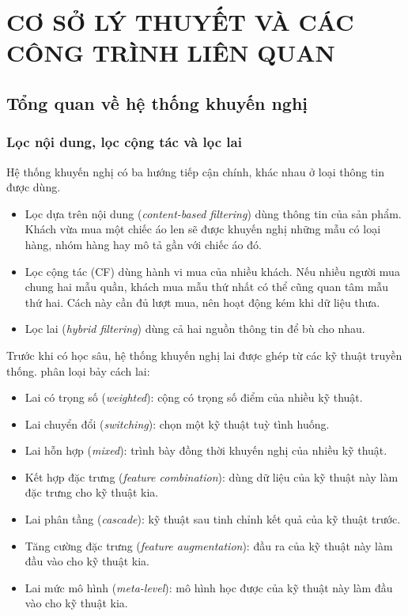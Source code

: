 \chapter{CƠ SỞ LÝ THUYẾT VÀ CÁC CÔNG TRÌNH LIÊN QUAN}
\label{chap:lythuyet}

\section{Tổng quan về hệ thống khuyến nghị}
\label{sec:tongquan_rs}

\subsection{Lọc nội dung, lọc cộng tác và lọc lai}
\label{subsec:khainiem_rs}

Hệ thống khuyến nghị có ba hướng tiếp cận chính, khác nhau ở loại thông tin được dùng.
\begin{itemize}
    \item Lọc dựa trên nội dung (\textit{content-based filtering}) dùng thông tin của sản phẩm. Khách vừa mua một chiếc áo len sẽ được khuyến nghị những mẫu có loại hàng, nhóm hàng hay mô tả gần với chiếc áo đó.
    \item Lọc cộng tác (CF) dùng hành vi mua của nhiều khách. Nếu nhiều người mua chung hai mẫu quần, khách mua mẫu thứ nhất có thể cũng quan tâm mẫu thứ hai. Cách này cần đủ lượt mua, nên hoạt động kém khi dữ liệu thưa.
    \item Lọc lai (\textit{hybrid filtering}) dùng cả hai nguồn thông tin để bù cho nhau.
\end{itemize}

Trước khi có học sâu, hệ thống khuyến nghị lai được ghép từ các kỹ thuật truyền thống. \textcite{burke2002hybrid} phân loại bảy cách lai:
\begin{itemize}
    \item Lai có trọng số (\textit{weighted}): cộng có trọng số điểm của nhiều kỹ thuật.
    \item Lai chuyển đổi (\textit{switching}): chọn một kỹ thuật tuỳ tình huống.
    \item Lai hỗn hợp (\textit{mixed}): trình bày đồng thời khuyến nghị của nhiều kỹ thuật.
    \item Kết hợp đặc trưng (\textit{feature combination}): dùng dữ liệu của kỹ thuật này làm đặc trưng cho kỹ thuật kia.
    \item Lai phân tầng (\textit{cascade}): kỹ thuật sau tinh chỉnh kết quả của kỹ thuật trước.
    \item Tăng cường đặc trưng (\textit{feature augmentation}): đầu ra của kỹ thuật này làm đầu vào cho kỹ thuật kia.
    \item Lai mức mô hình (\textit{meta-level}): mô hình học được của kỹ thuật này làm đầu vào cho kỹ thuật kia.
\end{itemize}

